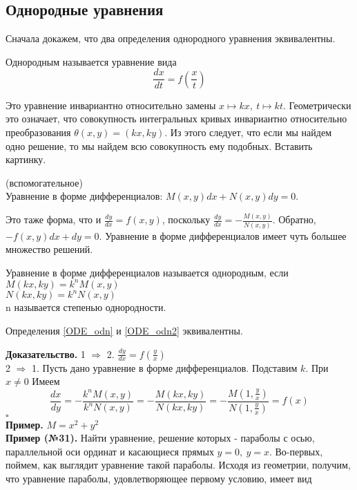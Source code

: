 \subsection{Однородные уравнения}
Сначала докажем, что два определения однородного уравнения эквивалентны.
\begin{defin}
Однородным называется уравнение вида
\begin{equation}%
    \frac{dx}{dt}=f\left(\frac{x}{t}\right) \label{ODE_odn}
\end{equation} 
\end{defin}
Это уравнение инвариантно относительно замены $x\mapsto kx,~t\mapsto kt$.
Геометрически это означает, что совокупность интегральных кривых инвариантно
относительно преобразования $\theta(x,y)=(kx,ky)$.
Из этого следует, что если мы найдем одно решение, то мы найдем всю 
совокупность ему подобных. Вставить картинку.
\begin{defin}
    (вспомогательное)\\
Уравнение в форме дифференциалов:
    $M(x,y)dx+N(x,y)dy=0$.  
\end{defin}
Это таже форма, что и $\frac{dy}{dx}=f(x,y)$, поскольку 
$\frac{dy}{dx}=-\frac{M(x,y)}{N(x,y)}$. Обратно, $-f(x,y)dx+dy=0$.
Уравнение в форме дифференциалов имеет чуть большее множество решений. 
\begin{defin}\label{ODE_odn2}
Уравнение в форме дифференциалов называется однородным, если\\
$M(kx,ky)=k^nM(x,y)$\\ 
$N(kx,ky)=k^nN(x,y)$\\
n называется степенью однородности.
\end{defin}
\begin{theor}
    Определения \ref{ODE_odn} и \ref{ODE_odn2} эквивалентны. 
\end{theor}
\textbf{Доказательство.} 1 $\Rightarrow$ 2. $\frac{dy}{dx}=f(\frac{y}{x})$\\
2 $\Rightarrow$ 1. Пусть дано уравнение в форме дифференциалов. Подставим $k$.
При $x\ne 0$ Имеем $$\frac{dx}{dy}=-\frac{k^nM(x,y)}{k^nN(x,y)}=
-\frac{M(kx,ky)}{N(kx,ky)}=-\frac{M(1,\frac{y}{x})}{N(1,\frac{y}{x})}=f(x)$$
$\square$ \\
\textbf{Пример.} $M=x^2+y^2$\\
\textbf{Пример (№31).} Найти уравнение, решение которых - параболы с осью, 
параллельной оси ординат и касающиеся прямых $y=0,~y=x$. 
Во-первых, поймем, как выглядит уравнение такой параболы. Исходя из геометрии,
получим, что уравнение параболы, удовлетворяющее первому условию, имеет вид 
